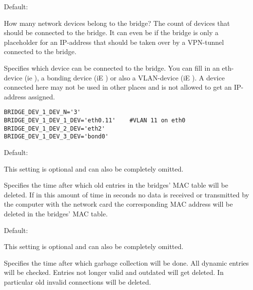 \begin{description}

  Default: 

  How many network devices belong to the bridge? The count of devices 
  that should be connected to the bridge. It can even be  if the 
  bridge is only a placeholder for an IP-address that should be taken 
  over by a VPN-tunnel connected to the bridge.


  Specifies which device can be connected to the bridge. You can fill in 
  an eth-device (ie ), a bonding device (iE ) or 
  also a VLAN-device (iE ).
  A device connected here may not be used in other places and is not 
  allowed to get an IP-address assigned.
  
\begin{example}
\begin{verbatim}
BRIDGE_DEV_1_DEV_N='3'
BRIDGE_DEV_1_DEV_1_DEV='eth0.11'	#VLAN 11 on eth0
BRIDGE_DEV_1_DEV_2_DEV='eth2'
BRIDGE_DEV_1_DEV_3_DEV='bond0'
\end{verbatim}
\end{example}


  Default: 

  This setting is optional and can also be completely omitted.

  Specifies the time after which old entries in the bridges' MAC 
  table will be deleted. If in this amount of time in seconds
  no data is received or transmitted by the computer with the network 
  card the corresponding MAC address will be deleted in the bridges' MAC table.
  
\hfil 

  Default: 
 
  This setting is optional and can also be completely omitted.

  Specifies the time after which \glqq{}garbage collection\grqq{} 
  will be done. All dynamic entries will be checked. Entries not 
  longer valid and outdated will get deleted. In particular old 
  invalid connections will be deleted.


\end{description}

